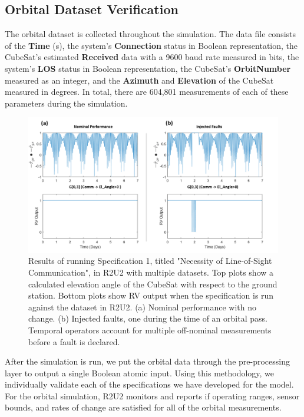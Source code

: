\documentclass[conf]{new-aiaa}
\begin{document}
\subsection{Orbital Dataset Verification}

The orbital dataset is collected throughout the simulation. The data file consists of the \textbf{Time} (s), the system's \textbf{Connection} status in Boolean representation, the CubeSat's estimated \textbf{Received} data with a 9600 baud rate measured in bits, the system's \textbf{LOS} status in Boolean representation,	the CubeSat's \textbf{OrbitNumber} measured as an integer, and the \textbf{Azimuth} and \textbf{Elevation} of the CubeSat measured in degrees. In total, there are 604,801 measurements of each of these parameters during the simulation.

\begin{figure}[!ht]
\centering
\includegraphics[width=.8\textwidth]{Fig/LOSEL_Spec1.png}
\caption{Results of running Specification 1, titled "Necessity of Line-of-Sight Communication", in R2U2 with multiple datasets. Top plots show a calculated elevation angle of the CubeSat with respect to the ground station. Bottom plots show RV output when the specification is run against the dataset in R2U2. (a) Nominal performance with no change. (b) Injected faults, one during the time of an orbital pass. Temporal operators account for multiple off-nominal measurements before a fault is declared.}
\label{ConnElSpecResults}
\end{figure}

After the simulation is run, we put the orbital data through the pre-processing layer to output a single Boolean atomic input. Using this methodology, we individually validate each of the specifications we have developed for the model. For the orbital simulation, R2U2 monitors and reports if operating ranges, sensor bounds, and rates of change are satisfied for all of the orbital measurements.
\end{document}
